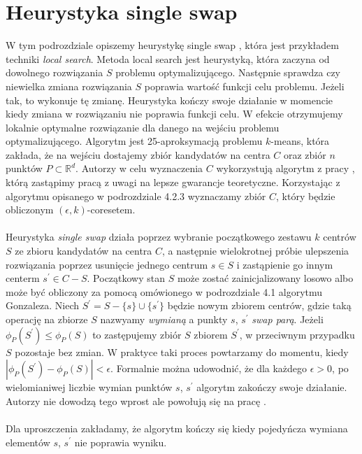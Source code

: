\section{Heurystyka single swap}

W tym podrozdziale opiszemy heurystykę single swap \cite{Arya2004LocalSH}, która jest przykładem techniki \textit{local search}.
Metoda local search jest heurystyką, która zaczyna od dowolnego rozwiązania $S$ problemu optymalizującego.
Następnie sprawdza czy niewielka zmiana rozwiązania $S$ poprawia wartość funkcji celu problemu.
Jeżeli tak, to wykonuje tę zmianę.
Heurystyka kończy swoje działanie w momencie kiedy zmiana w rozwiązaniu nie poprawia funkcji celu.
W efekcie otrzymujemy lokalnie optymalne rozwiązanie dla danego na wejściu problemu optymalizującego.
Algorytm jest 25-aproksymacją problemu $k$-means, która zakłada, że na wejściu dostajemy zbiór kandydatów na centra $C$ oraz zbiór $n$ punktów $P \subset \mathbb{R}^d$.
Autorzy \cite{Arya2004LocalSH} w celu wyznaczenia $C$ wykorzystują algorytm z pracy \cite{Matousek99onapproximate}, którą zastąpimy pracą \cite{10.1145/1007352.1007400} z uwagi na lepsze gwarancje teoretyczne.
Korzystając z algorytmu opisanego w podrozdziale 4.2.3 wyznaczamy zbiór $C$, który będzie obliczonym $(\epsilon, k)$-coresetem.
\\~\\
Heurystyka \textit{single swap} działa poprzez wybranie początkowego zestawu $k$ centrów $S$ ze zbioru kandydatów na centra $C$, a następnie wielokrotnej
próbie ulepszenia rozwiązania poprzez usunięcie jednego centrum $s \in S$ i zastąpienie go innym centerm $s^{'} \in C - S$.
Początkowy stan $S$ może zostać zainicjalizowany losowo albo może być obliczony za pomocą omówionego w podrozdziale 4.1 algorytmu Gonzaleza.
Niech $S^{'} = S - \{s\} \cup \{s^{'}\}$ będzie nowym zbiorem centrów, gdzie taką operację na zbiorze $S$ nazwyamy \textit{wymianą} a punkty $s$, $s^{'}$ \textit{swap parą}.
Jeżeli $\phi_{P}(S^{'}) \leq \phi_{P}(S)$ to zastępujemy zbiór $S$ zbiorem $S^{'}$, w przeciwnym przypadku $S$ pozostaje bez zmian.
W praktyce taki proces powtarzamy do momentu, kiedy $|\phi_{P}(S^{'}) - \phi_{P}(S) | < \epsilon$.
Formalnie można udowodnić, że dla każdego $\epsilon > 0$, po wielomianiwej liczbie wymian punktów $s$, $s^{'}$ algorytm zakończy swoje działanie.
Autorzy nie dowodzą tego wprost ale powołują się na pracę \cite{10.1145/380752.380755}.
\\~\\
Dla uproszczenia zakładamy, że algorytm kończy się kiedy pojedyńcza wymiana elementów $s$, $s^{'}$ nie poprawia wyniku.

